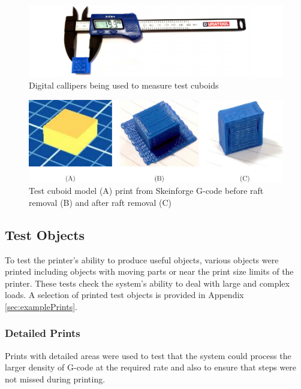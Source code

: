 			\begin{figure}
				\includegraphics[width=1\textwidth]{diagrams/calipers.pdf}
				\caption{Digital callipers being used to measure test cuboids}
				\label{fig:calipers}
			\end{figure}
			
			\begin{figure}
				\includegraphics[width=1\textwidth]{diagrams/testCubes.pdf}
				\caption{Test cuboid model (A) print from Skeinforge G-code before raft
				         removal (B) and after raft removal (C)}
				\label{fig:testCubes}
			\end{figure}
			
		
		\subsection{Test Objects}
			
			To test the printer's ability to produce useful objects, various objects
			were printed including objects with moving parts or near the
			print size limits of the printer. These tests check the system's ability
			to deal with large and complex loads. A selection of printed test objects
			is provided in Appendix \ref{sec:examplePrints}.
			
			\subsubsection{Detailed Prints}
				
				Prints with detailed areas were used to test that the system could
				process the larger density of G-code at the required rate and also to
				ensure that steps were not missed during printing.
				
